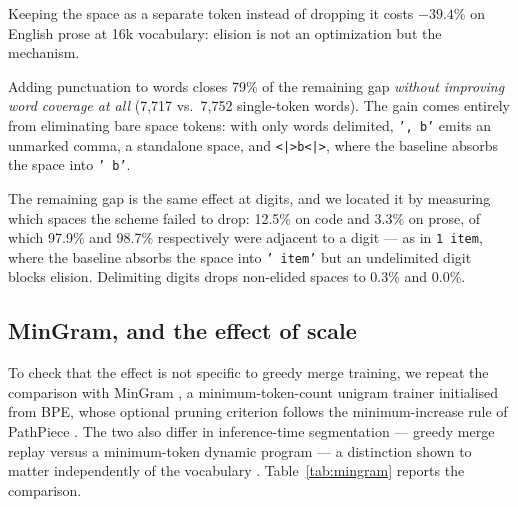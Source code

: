 \documentclass[11pt]{article}
\newcommand{\mk}{\texttt{<|>}}
\begin{document}
Keeping the space as a separate token instead of dropping it costs $-39.4\%$ on English
prose at 16k vocabulary: elision is not an optimization but the mechanism.

Adding punctuation to words closes 79\% of the remaining gap \emph{without improving word
coverage at all} (7{,}717 vs.\ 7{,}752 single-token words). The gain comes entirely from
eliminating bare space tokens: with only words delimited, \texttt{', b'} emits an unmarked
comma, a standalone space, and \texttt{\mk{}b\mk{}}, where the baseline absorbs the space
into \texttt{' b'}.

The remaining gap is the same effect at digits, and we located it by measuring which spaces
the scheme failed to drop: 12.5\% on code and 3.3\% on prose, of which 97.9\% and 98.7\%
respectively were adjacent to a digit --- as in \texttt{1 item}, where the baseline absorbs
the space into \texttt{' item'} but an undelimited digit blocks elision. Delimiting digits
drops non-elided spaces to 0.3\% and 0.0\%.

\subsection{MinGram, and the effect of scale}
\label{sec:mingram}

To check that the effect is not specific to greedy merge training, we repeat the comparison
with MinGram \citep{land2026mingram}, a minimum-token-count unigram trainer initialised from
BPE, whose optional pruning criterion follows the minimum-increase rule of PathPiece
\citep{schmidt-etal-2024-tokenization}. The two also differ in inference-time segmentation
--- greedy merge replay versus a minimum-token dynamic program --- a distinction shown to
matter independently of the vocabulary \citep{uzan-etal-2024-greed}. Table~\ref{tab:mingram}
reports the comparison.
\end{document}
